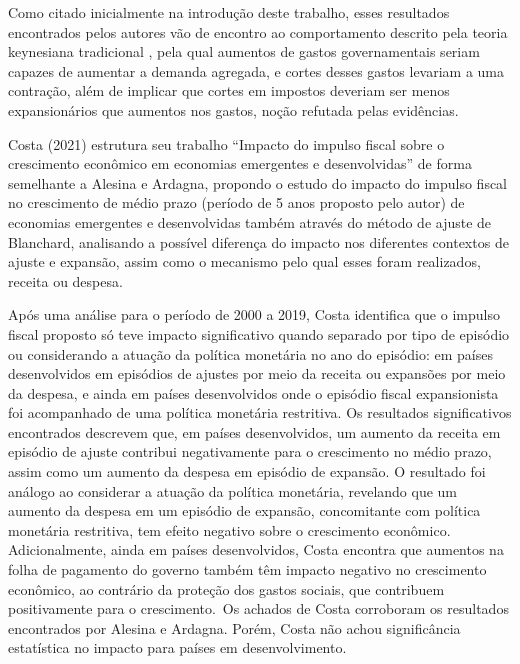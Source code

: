\documentclass[a4paper, 12pt, openany, oneside, brazil]{abntex2}
\begin{document}
Como citado inicialmente na introdução deste trabalho, esses resultados encontrados pelos autores vão de encontro ao comportamento descrito pela teoria keynesiana tradicional \cite{Alesina1998}, pela qual aumentos de gastos governamentais seriam capazes de aumentar a demanda agregada, e cortes desses gastos levariam a uma contração, além de implicar que cortes em impostos deveriam ser menos expansionários que aumentos nos gastos, noção refutada pelas evidências.

Costa (2021) estrutura seu trabalho “Impacto do impulso fiscal sobre o crescimento econômico em economias emergentes e desenvolvidas” de forma semelhante a Alesina e Ardagna, propondo o estudo do impacto do impulso fiscal no crescimento de médio prazo (período de 5 anos proposto pelo autor) de economias emergentes e desenvolvidas também através do método de ajuste de Blanchard, analisando a possível diferença do impacto nos diferentes contextos de ajuste e expansão, assim como o mecanismo pelo qual esses foram realizados, receita ou despesa. 

Após uma análise para o período de 2000 a 2019, Costa identifica que o impulso fiscal proposto só teve impacto significativo quando separado por tipo de episódio ou considerando a atuação da política monetária no ano do episódio: em países desenvolvidos em episódios de ajustes por meio da receita ou expansões por meio da despesa, e ainda em países desenvolvidos onde o episódio fiscal expansionista foi acompanhado de uma política monetária restritiva. Os resultados significativos encontrados descrevem que, em países desenvolvidos, um aumento da receita em episódio de ajuste contribui negativamente para o crescimento no médio prazo, assim como um aumento da despesa em episódio de expansão. O resultado foi análogo ao considerar a atuação da política monetária, revelando que um aumento da despesa em um episódio de expansão, concomitante com política monetária restritiva, tem efeito negativo sobre o crescimento econômico. Adicionalmente, ainda em países desenvolvidos, Costa encontra que aumentos na folha de pagamento do governo também têm impacto negativo no crescimento econômico, ao contrário da proteção dos gastos sociais, que contribuem positivamente para o crescimento. Os achados de Costa corroboram os resultados encontrados por Alesina e Ardagna. Porém, Costa não achou significância estatística no impacto para países em desenvolvimento.
\end{document}
